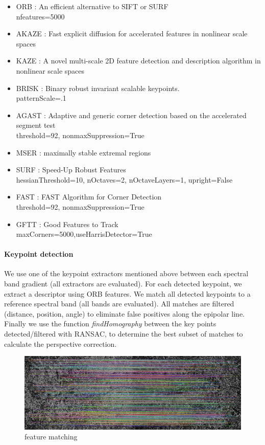 \documentclass[]{elsarticle}
\begin{document}
	\begin{itemize}
		\item ORB : An efficient alternative to SIFT or SURF \\ nfeatures=5000
		\item AKAZE : Fast explicit diffusion for accelerated features in nonlinear scale spaces
		\item KAZE : A novel multi-scale 2D feature detection and description algorithm in nonlinear scale spaces \cite{rs10050756}
		\item BRISK : Binary robust invariant scalable keypoints. \\ patternScale=.1
		\item AGAST : Adaptive and generic corner detection based on the accelerated segment test \\ threshold=92, nonmaxSuppression=True
		\item MSER : maximally stable extremal regions
		\item SURF : Speed-Up Robust Features \\ hessianThreshold=10, nOctaves=2, nOctaveLayers=1, upright=False
		\item FAST : FAST Algorithm for Corner Detection \\  threshold=92, nonmaxSuppression=True
		\item GFTT : Good Features to Track \\ maxCorners=5000,useHarrisDetector=True
	\end{itemize}
	
	\paragraph{Keypoint detection}
	We use one of the keypoint extractors mentioned above between each spectral band gradient (all extractors are evaluated).
	For each detected keypoint, we extract a descriptor using ORB features.
	We match all detected keypoints to a reference spectral band (all bands are evaluated).
	All matches are filtered (distance, position, angle) to eliminate false positives along the epipolar line.
	Finally we use the function \textit{findHomography} between the key points detected/filtered with RANSAC,
	to determine the best subset of matches to calculate the perspective correction.
	
	
	\begin{figure}[!htb]
		\centering
		\includegraphics[width=0.7\linewidth]{../figures/prespective-feature-matching.jpg}
		\caption{feature matching}
		\label{fig:feature-matching}
	\end{figure}
	
\end{document}
